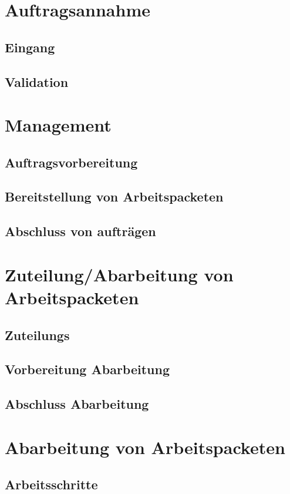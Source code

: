 \section{Auftragsannahme}
\subsection{Eingang}
\subsection{Validation}

\section{Management}
\subsection{Auftragsvorbereitung}
\subsection{Bereitstellung von Arbeitspacketen}
\subsection{Abschluss von auftr\"agen}


\section{Zuteilung/Abarbeitung von Arbeitspacketen}
\subsection{Zuteilungs}
\subsection{Vorbereitung Abarbeitung}
\subsection{Abschluss Abarbeitung}


\section{Abarbeitung von Arbeitspacketen}
\subsection{Arbeitsschritte}
